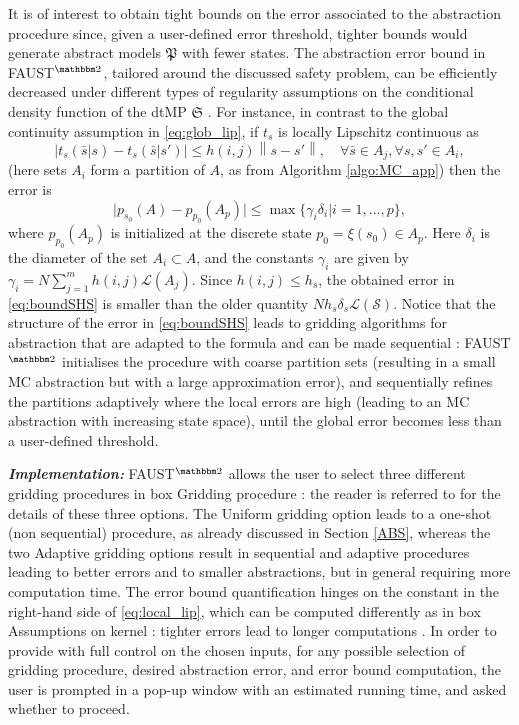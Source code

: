 \documentclass{llncs}
\newcommand*\circled[1]{\tikz[baseline=(char.base)]{\node[shape=circle,draw,inner sep=0.5pt] (char) {#1};}}
\newcommand{\software}{\textsf{FAUST}$^{\mathbbm 2}$\xspace}
\newcommand{\boxname}[1]{\textsf{#1}}
\begin{document}
It is of interest to obtain tight bounds on the error associated to the abstraction procedure since, 
given a user-defined error threshold,   
tighter bounds would generate abstract models $\mathfrak P$ with fewer states. 
The abstraction error bound in \software, tailored around the discussed safety problem, 
can be efficiently decreased under different types of regularity assumptions on the conditional density function of the dtMP $\mathfrak S$ \cite{SA13}.  
For instance, in contrast to the global continuity assumption in \eqref{eq:glob_lip}, 
if $t_s$ is locally Lipschitz continuous as 
\begin{equation}
\label{eq:local_lip}
\left|t_{s}(\bar{s}\vert s)-t_{s}(\bar{s}\vert s')\right|\leq h(i,j)\left\|s-s'\right\|, \quad\forall\bar{s}\in A_{j}, \forall s,s'\in A_{i}, 
\end{equation}
(here sets $A_i$ form a partition of $A$, as from Algorithm \ref{algo:MC_app})  
then the error is 
\begin{equation}
\label{eq:boundSHS}
\vert p_{s_{0}}(A) - p_{p_{0}}(A_p)\vert\leq \max\{\gamma_{i}\delta_{i}\vert i=1,...,p\}, 
\end{equation}
where $p_{p_{0}}(A_p)$ is initialized at the discrete state $p_0=\xi(s_0)\in A_p$. 
Here $\delta_{i}$ is the diameter of the set $A_{i}\subset A$,
and the constants $\gamma_{i}$ are given by 
$\gamma_{i} = N\sum_{j=1}^{m}h (i,j) \mathscr L(A_{j})$. 
Since $h(i,j) \leq h_s$, the obtained error in \eqref{eq:boundSHS} is smaller than the older quantity $N h_s\delta_s\mathscr L(\mathcal S)$.
Notice that the structure of the error in \eqref{eq:boundSHS}
leads to gridding algorithms for abstraction that are adapted to the formula and can be made sequential \cite{SA13}: 
\software initialises the procedure with coarse partition sets (resulting in a small MC abstraction but with a large approximation error), 
and sequentially refines the partitions adaptively where the local errors are high 
(leading to an MC abstraction with increasing state space),  
until the global error becomes less than a user-defined threshold. 

\textit{\textbf{Implementation: }}
\software allows the user to select three different gridding procedures in box \boxname{Gridding procedure} \circled{4}:  
the reader is referred to \cite{SA13} for the details of these three options. 
The \boxname{Uniform gridding} option leads to a one-shot (non sequential) procedure, as already discussed in Section \ref{ABS}, 
whereas the two \boxname{Adaptive gridding} options result in sequential and adaptive procedures leading to better errors and to smaller abstractions,   
but in general requiring more computation time. 
The error bound quantification hinges on the constant in the right-hand side of \eqref{eq:local_lip},  
which can be computed differently as in box \boxname{Assumptions on kernel} \circled{4}: tighter errors lead to longer computations \cite{SA13}. 
In order to provide with full control on the chosen inputs, 
for any possible selection of gridding procedure, desired abstraction error, and error bound computation, 
the user is prompted in a pop-up window with an estimated running time, and asked whether to proceed. 
\end{document}

